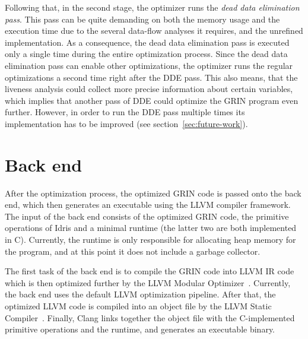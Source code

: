 \documentclass[main.tex]{subfiles}
\begin{document}
	Following that, in the second stage, the optimizer runs the \textit{dead data elimination pass}. This pass can be quite demanding on both the memory usage and the execution time due to the several data-flow analyses it requires, and the unrefined implementation. As a consequence, the dead data elimination pass is executed only a single time during the entire optimization process. Since the dead data elimination pass can enable other optimizations, the optimizer runs the regular optimizations a second time right after the DDE pass. This also means, that the liveness analysis could collect more precise information about certain variables, which implies that another pass of DDE could optimize the GRIN program even further. However, in order to run the DDE pass multiple times its implementation has to be improved (see section~\ref{sec:future-work}).
	
	\section{Back end}
	\label{subsec:llvm-back-end}
	
	After the optimization process, the optimized GRIN code is passed onto the back end, which then generates an executable using the LLVM compiler framework. The input of the back end consists of the optimized GRIN code, the primitive operations of Idris and a minimal runtime (the latter two are both implemented in C). Currently, the runtime is only responsible for allocating heap memory for the program, and at this point it does not include a garbage collector.
	
	The first task of the back end is to compile the GRIN code into LLVM IR code which is then optimized further by the LLVM Modular Optimizer~\cite{opt}. Currently, the back end uses the default LLVM optimization pipeline. After that, the optimized LLVM code is compiled into an object file by the LLVM Static Compiler~\cite{llc}. Finally, Clang links together the object file with the C-implemented primitive operations and the runtime, and generates an executable binary.
	
\end{document}
